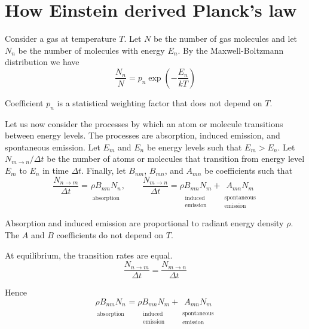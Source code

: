 \documentclass[12pt]{article}
\newcommand\BNM{B_{nm}} %
\newcommand\BMN{B_{mn}} %
\newcommand\AMN{A_{mn}} %
\newcommand\RHO{\rho}
\newcommand\ABSORPTION{\substack{\\[1ex] \text{absorption}}}
\newcommand\INDUCED{\substack{\\[1ex] \text{induced}\\ \text{emission}}}
\newcommand\SPONTANEOUS{\substack{\\[1ex] \text{spontaneous}\\ \text{emission}}}
\begin{document}
\section*{How Einstein derived Planck's law}


Consider a gas at temperature $T$.
Let $N$ be the number of gas molecules
and let $N_n$ be the number of molecules with energy $E_n$.
By the Maxwell-Boltzmann distribution we have
\begin{equation*}
\frac{N_n}{N}=p_n\exp\left(-\frac{E_n}{kT}\right)
\tag{1}
\end{equation*}

Coefficient $p_n$ is a statistical weighting factor that does not depend on $T$.

\bigskip
Let us now consider the processes by which an atom or molecule transitions between energy levels.
The processes are absorption, induced emission, and spontaneous emission.
Let $E_m$ and $E_n$ be energy levels such that $E_m>E_n$.
Let $N_{m\rightarrow n}/\Delta t$ be the number of atoms or molecules that transition from energy level $E_m$ to $E_n$ in time $\Delta t$.
Finally, let $\BNM$, $\BMN$, and $\AMN$ be coefficients such that
\begin{equation*}
\frac{N_{n\rightarrow m}}{\Delta t}
=\underset{\ABSORPTION}{\RHO\BNM N_n},
\qquad
\frac{N_{m\rightarrow n}}{\Delta t}
=\underset{\INDUCED}{\RHO\BMN N_m}
+
\underset{\SPONTANEOUS}{\AMN N_m}
\end{equation*}

Absorption and induced emission are proportional to radiant energy density $\rho$.
The $A$ and $B$ coefficients do not depend on $T$.

\bigskip
At equilibrium, the transition rates are equal.
\begin{equation*}
\frac{N_{n\rightarrow m}}{\Delta t}=\frac{N_{m\rightarrow n}}{\Delta t}
\end{equation*}

Hence
\begin{equation*}
\underset{\ABSORPTION}{\RHO\BNM N_n}
=\underset{\INDUCED}{\RHO\BMN N_m}
+\underset{\SPONTANEOUS}{\AMN N_m}
\end{equation*}
\end{document}

